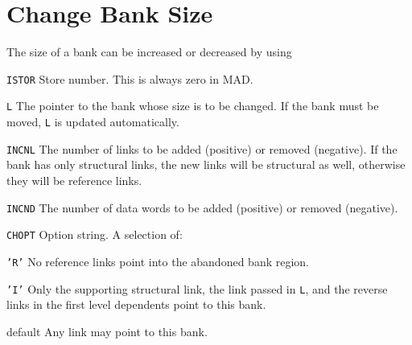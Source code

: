\section{Change Bank Size}
\label{MZPUSH}
The size of a bank can be increased or decreased by using
\begin{mylist}
\item[\tt ISTOR]
    Store number. This is always zero in MAD.
\item[\tt L]
    The pointer to the bank whose size is to be changed.
    If the bank must be moved, {\tt L} is updated automatically.
\item[\tt INCNL]
    The number of links to be added (positive) or removed (negative).
    If the bank has only structural links, the new links will be
    structural as well, otherwise they will be reference links.
\item[\tt INCND]
    The number of data words to be added (positive) or removed
    (negative).
\item[\tt CHOPT]
    Option string. A selection of:
    \begin{mylist}
    \item[\tt 'R']
        No reference links point into the abandoned bank region.
    \item[\tt 'I']
        Only the supporting structural link,
        the link passed in {\tt L}, and the reverse links in the first
        level dependents point to this bank.
    \item[default]
        Any link may point to this bank.
    \end{mylist}
\end{mylist}

